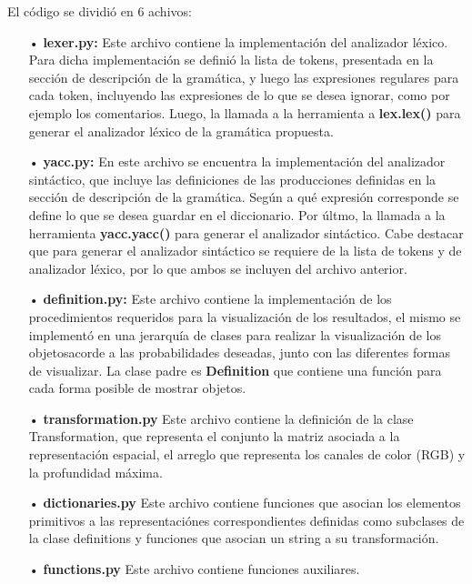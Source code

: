 El c\'odigo se dividi\'o en 6 achivos:
\begin{itemize}
\item[•] \textbf{lexer.py:} Este archivo contiene la implementaci\'on del analizador l\'exico. Para dicha implementaci\'on se defini\'o la lista de tokens, presentada en la secci\'on de descripci\'on de la gram\'atica, y luego las expresiones regulares para cada token, incluyendo las expresiones de lo que se desea ignorar, como por ejemplo los comentarios. Luego, la llamada a la herramienta a \textbf{lex.lex()} para generar el analizador l\'exico de la gram\'atica propuesta.

\item[•] \textbf{yacc.py:} En este archivo se encuentra la implementaci\'on del analizador sint\'actico, que incluye las definiciones de las producciones definidas en la secci\'on de descripci\'on de la gram\'atica. Seg\'un a qu\'e expresi\'on corresponde se define lo que se desea guardar en el diccionario. Por \'ultmo, la llamada a la herramienta \textbf{yacc.yacc()} para generar el analizador sint\'actico. Cabe destacar que para generar el analizador sint\'actico se requiere de la lista de tokens y de analizador l\'exico, por lo que ambos se incluyen del archivo anterior.

\item[•] \textbf{definition.py:} Este archivo contiene la implementaci\'on de los procedimientos requeridos para la visualizaci\'on de los resultados, el mismo se implement\'o en una jerarqu\'ia de clases para realizar la visualizaci\'on de los objetosacorde a las probabilidades deseadas, junto con las diferentes formas de visualizar. La clase padre es \textbf{Definition} que contiene una funci\'on para cada forma posible de mostrar objetos. 

\item[•] \textbf{transformation.py} Este archivo contiene la definici\'on de la clase Transformation, que representa el conjunto la matriz asociada a la representaci\'on espacial, el arreglo que representa los canales de color (RGB) y la profundidad m\'axima.

\item[•] \textbf{dictionaries.py} Este archivo contiene funciones que asocian los elementos primitivos a las representaci\'ones correspondientes definidas como subclases de la clase definitions y funciones que asocian un string a su transformaci\'on.

\item[•] \textbf{functions.py} Este archivo contiene funciones auxiliares.
\end{itemize}

